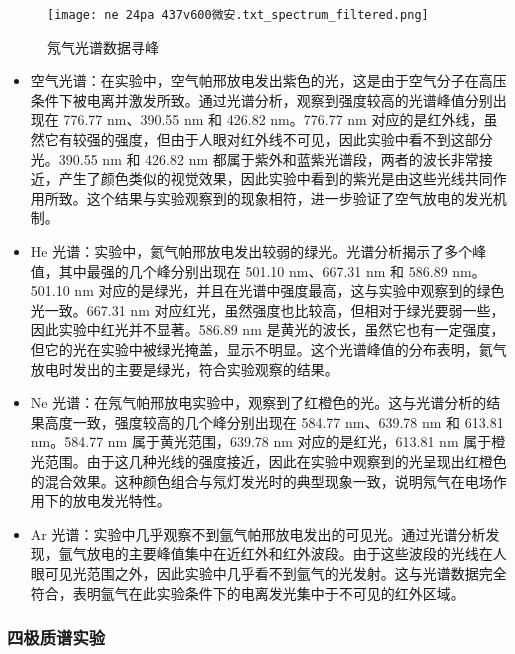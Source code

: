 \documentclass[dvipsnames, svgnames,a4paper,11pt]{article}
\begin{document}
	\begin{figure}[{H}]
		\centering
		\begin{minipage}{0.45\linewidth}
			\centering
			\texttt{[image: ne 24pa 437v600微安.txt\_spectrum\_filtered.png]}
			\caption{氖气光谱数据寻峰}
		\end{minipage}
	\end{figure}
	
	\begin{itemize}
		\item 空气光谱：在实验中，空气帕邢放电发出紫色的光，这是由于空气分子在高压条件下被电离并激发所致。通过光谱分析，观察到强度较高的光谱峰值分别出现在 776.77 nm、390.55 nm 和 426.82 nm。776.77 nm 对应的是红外线，虽然它有较强的强度，但由于人眼对红外线不可见，因此实验中看不到这部分光。390.55 nm 和 426.82 nm 都属于紫外和蓝紫光谱段，两者的波长非常接近，产生了颜色类似的视觉效果，因此实验中看到的紫光是由这些光线共同作用所致。这个结果与实验观察到的现象相符，进一步验证了空气放电的发光机制。
		
		\item He 光谱：实验中，氦气帕邢放电发出较弱的绿光。光谱分析揭示了多个峰值，其中最强的几个峰分别出现在 501.10 nm、667.31 nm 和 586.89 nm。501.10 nm 对应的是绿光，并且在光谱中强度最高，这与实验中观察到的绿色光一致。667.31 nm 对应红光，虽然强度也比较高，但相对于绿光要弱一些，因此实验中红光并不显著。586.89 nm 是黄光的波长，虽然它也有一定强度，但它的光在实验中被绿光掩盖，显示不明显。这个光谱峰值的分布表明，氦气放电时发出的主要是绿光，符合实验观察的结果。
		
		\item Ne 光谱：在氖气帕邢放电实验中，观察到了红橙色的光。这与光谱分析的结果高度一致，强度较高的几个峰分别出现在 584.77 nm、639.78 nm 和 613.81 nm。584.77 nm 属于黄光范围，639.78 nm 对应的是红光，613.81 nm 属于橙光范围。由于这几种光线的强度接近，因此在实验中观察到的光呈现出红橙色的混合效果。这种颜色组合与氖灯发光时的典型现象一致，说明氖气在电场作用下的放电发光特性。
		
		\item Ar 光谱：实验中几乎观察不到氩气帕邢放电发出的可见光。通过光谱分析发现，氩气放电的主要峰值集中在近红外和红外波段。由于这些波段的光线在人眼可见光范围之外，因此实验中几乎看不到氩气的光发射。这与光谱数据完全符合，表明氩气在此实验条件下的电离发光集中于不可见的红外区域。
	\end{itemize}
	
	
	\subsubsection{四极质谱实验}
\end{document}
